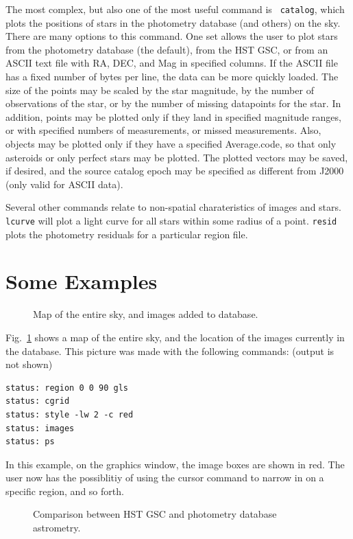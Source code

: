 \documentclass{article}
\begin{document}
The most complex, but also one of the most useful command is {\tt
  catalog}, which plots the positions of stars in the photometry
database (and others) on the sky.  There are many options to this
command.  One set allows the user to plot stars from the photometry
database (the default), from the HST GSC, or from an ASCII text file
with RA, DEC, and Mag in specified columns.  If the ASCII file has a
fixed number of bytes per line, the data can be more quickly loaded.
The size of the points may be scaled by the star magnitude, by the
number of observations of the star, or by the number of missing
datapoints for the star.  In addition, points may be plotted only if
they land in specified magnitude ranges, or with specified numbers of
measurements, or missed measurements.  Also, objects may be plotted
only if they have a specified Average.code, so that only asteroids or
only perfect stars may be plotted.  The plotted vectors may be saved,
if desired, and the source catalog epoch may be specified as different
from J2000 (only valid for ASCII data).

Several other commands relate to non-spatial charateristics of images
and stars.  {\tt lcurve} will plot a light curve for all stars within
some radius of a point.  {\tt resid} plots the photometry residuals
for a particular region file.  

\section{Some Examples}

\begin{figure}
\caption{\label{allsky} 
Map of the entire sky, and images added to database.
}
\end{figure}

Fig.~\ref{allsky} shows a map of the entire sky, and the location
of the images currently in the database.  This picture was made with
the following commands: (output is not shown) \\
\begin{verbatim}
status: region 0 0 90 gls
status: cgrid
status: style -lw 2 -c red 
status: images
status: ps
\end{verbatim}
In this example, on the graphics window, the image boxes are shown in
red.  The user now has the possiblitiy of using the cursor command to
narrow in on a specific region, and so forth.  

\begin{figure}
\caption{\label{catalog} 
Comparison between HST GSC and photometry database astrometry. 
}
\end{figure}
\end{document}
